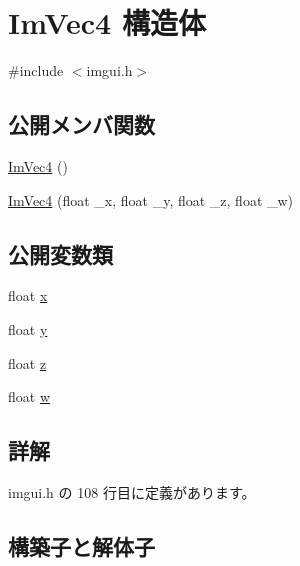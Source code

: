 \hypertarget{struct_im_vec4}{}\section{Im\+Vec4 構造体}
\label{struct_im_vec4}


{\ttfamily \#include $<$imgui.\+h$>$}

\subsection*{公開メンバ関数}
\begin{DoxyCompactItemize}
\item 
\mbox{\hyperlink{struct_im_vec4_a6fba9919c960ca7eda33969d700d2a86}{Im\+Vec4}} ()
\item 
\mbox{\hyperlink{struct_im_vec4_af9e535f36b0fc7b9af0f60951fb4ffe4}{Im\+Vec4}} (float \+\_\+x, float \+\_\+y, float \+\_\+z, float \+\_\+w)
\end{DoxyCompactItemize}
\subsection*{公開変数類}
\begin{DoxyCompactItemize}
\item 
float \mbox{\hyperlink{struct_im_vec4_a2090f651f5e5b78fedae8dab87343db6}{x}}
\item 
float \mbox{\hyperlink{struct_im_vec4_a6b4d00ae261be4fe54353c759c561fe7}{y}}
\item 
float \mbox{\hyperlink{struct_im_vec4_aba6a75356917a28c967954bb29133a1a}{z}}
\item 
float \mbox{\hyperlink{struct_im_vec4_afeed5acd9f0d2043175f4da229d12a38}{w}}
\end{DoxyCompactItemize}


\subsection{詳解}


 imgui.\+h の 108 行目に定義があります。



\subsection{構築子と解体子}
\mbox{\label{struct_im_vec4_a6fba9919c960ca7eda33969d700d2a86}} 
